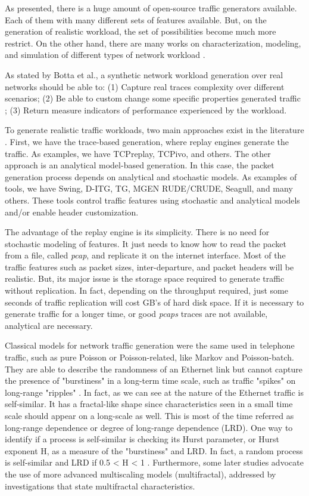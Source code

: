 As presented, there is a huge amount of open-source traffic generators available. Each of them with many different sets of features available. But, on the generation of realistic workload, the set of possibilities become much more restrict. On the other hand, there are many works on characterization, modeling, and simulation of different types of network workload \cite{ditg-paper}.


As stated by Botta et al.\cite{ditg-paper},  a synthetic network workload generation over real networks should be able to: (1) Capture real traces complexity over different scenarios; (2) Be able to custom change some specific properties generated traffic ; (3) Return measure indicators of performance experienced by the workload.


To generate realistic traffic workloads, two main approaches exist in the literature \cite{ditg-paper}. First, we have the trace-based generation, where replay engines generate the traffic. As examples, we have TCPreplay, TCPivo, and others. The other approach is an analytical model-based generation. In this case, the packet generation process depends on analytical and stochastic models. As examples of tools, we have Swing, D-ITG, TG, MGEN RUDE/CRUDE, Seagull, and many others.  These tools control traffic features using stochastic and analytical models and/or enable header customization. 


The advantage of the replay engine is its simplicity. There is no need for stochastic modeling of features. It just needs to know how to read the packet from a file, called \textit{pcap}, and replicate it on the internet interface. Most of the traffic features such as packet sizes, inter-departure, and packet headers will be realistic. But, its major issue is the storage space required to generate traffic without replication. In fact, depending on the throughput required, just some seconds of traffic replication will cost GB's of hard disk space. If it is necessary to generate traffic for a longer time, or good \textit{pcaps} traces are not available, analytical are necessary. 


Classical models for network traffic generation were the same used in telephone traffic, such as pure Poisson or Poisson-related, like Markov and Poisson-batch\cite{selfsimilar-ethernet}. They are able to describe the randomness of an Ethernet link but cannot capture the presence of "burstiness" in a long-term time scale, such as traffic "spikes" on long-range "ripples" \cite{selfsimilar-ethernet}. In fact, as we can see at \cite{selfsimilar-ethernet} the nature of the Ethernet traffic is self-similar. It has a fractal-like shape since characteristics seen in a small time scale should appear on a long-scale as well. This is most of the time referred as long-range dependence or degree of long-range dependence (LRD). One way to identify if a process is self-similar is checking its Hurst parameter, or Hurst exponent H, as a measure of the "burstiness" and LRD. In fact, a random process is self-similar and LRD  if 0.5 < H < 1 \cite{stochartic-selfsimilar}. Furthermore, some later studies advocate the use of more advanced multiscaling models (multifractal), addressed by investigations that state multifractal characteristics.

